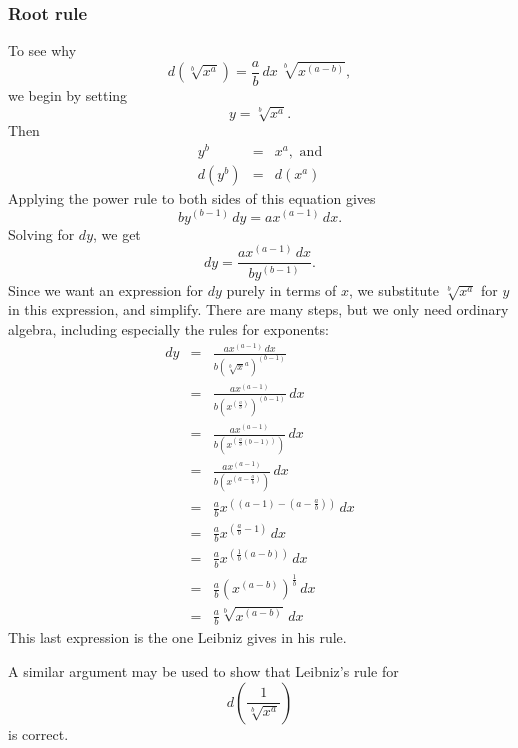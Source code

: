 \documentclass[polutonikogreek,english,twoside,openright]{article}
\newlength{\oldjot}
\begin{document}
\subsubsection*{Root rule}

To see why 
$$d(\sqrt[b]{x^a}) = \frac{a}{b}\,dx\,\sqrt[b]{x^{(a-b)}},$$
 we begin by setting
$$y = \sqrt[b]{x^a}.$$
Then
\begin{eqnarray*}
y^b & = & x^a, \mbox{ and}\\
d(y^b) & = & d(x^a)
\end{eqnarray*}
Applying the power rule to both sides of this equation gives
$$by^{(b-1)}\,dy = ax^{(a-1)}\,dx.$$
Solving for $dy$, we get
$$dy = \frac{ax^{(a-1)}\,dx}{by^{(b-1)}}.$$
Since we want an expression for $dy$ purely in terms of $x$, we
substitute $\sqrt[b]{x^a}$ for $y$ in this expression, and simplify.
There are many steps, but we only need ordinary algebra, including
especially the rules for exponents: \setlength{\jot}{2ex}
\begin{eqnarray*}
dy & = & \frac{ax^{(a-1)}\,dx}{b(\sqrt[b]x^a)^{(b-1)}}\\
 & = & \frac{ax^{(a-1)}}{b(x^{(\frac{a}{b})})^{(b-1)}}\,dx\\
 & = & \frac{ax^{(a-1)}}{b(x^{(\frac{a}{b}(b-1))})}\,dx\\
 & = & \frac{ax^{(a-1)}}{b(x^{(a- \frac{a}{b})})}\,dx\\
 & = & \frac{a}{b} x^{((a-1) - (a- \frac{a}{b}))}\,dx\\
 & = & \frac{a}{b} x^{(\frac{a}{b} - 1)}\,dx\\
 & = & \frac{a}{b} x^{(\frac{1}{b}(a- b))}\,dx\\
 & = & \frac{a}{b} (x^{(a-b)})^\frac{1}{b}\,dx\\
 & = & \frac{a}{b} \sqrt[b]{x^{(a-b)}}\,dx
\end{eqnarray*}
\setlength{\jot}{\oldjot}
This last expression is the one Leibniz gives in his rule.

A similar argument may be used to show that Leibniz's rule for 
$$d\left(\frac{1}{\sqrt[b]{x^a}}\right)$$
is correct.
\end{document}
